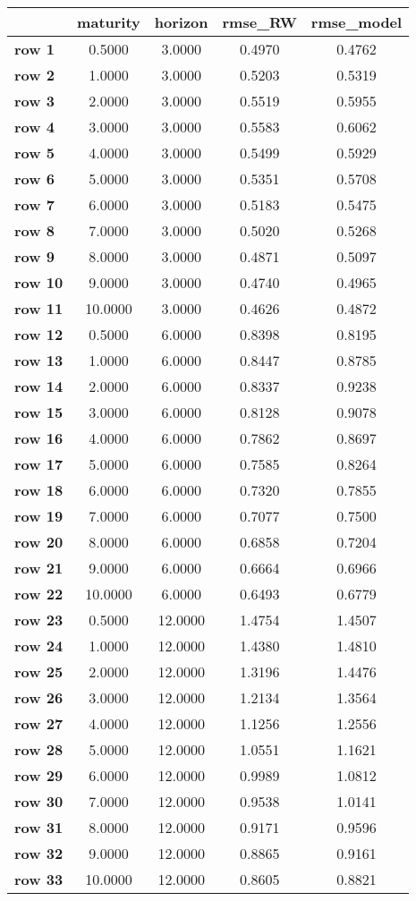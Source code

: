 \begin{tiny}\begin{tabular}{|l|c|c|c|c|}
\hline
&\textbf{maturity}&\textbf{horizon}&\textbf{rmse_RW}&\textbf{rmse_model}\\\hline
\textbf{row 1}&0.5000&3.0000&0.4970&0.4762\\\hline
\textbf{row 2}&1.0000&3.0000&0.5203&0.5319\\\hline
\textbf{row 3}&2.0000&3.0000&0.5519&0.5955\\\hline
\textbf{row 4}&3.0000&3.0000&0.5583&0.6062\\\hline
\textbf{row 5}&4.0000&3.0000&0.5499&0.5929\\\hline
\textbf{row 6}&5.0000&3.0000&0.5351&0.5708\\\hline
\textbf{row 7}&6.0000&3.0000&0.5183&0.5475\\\hline
\textbf{row 8}&7.0000&3.0000&0.5020&0.5268\\\hline
\textbf{row 9}&8.0000&3.0000&0.4871&0.5097\\\hline
\textbf{row 10}&9.0000&3.0000&0.4740&0.4965\\\hline
\textbf{row 11}&10.0000&3.0000&0.4626&0.4872\\\hline
\textbf{row 12}&0.5000&6.0000&0.8398&0.8195\\\hline
\textbf{row 13}&1.0000&6.0000&0.8447&0.8785\\\hline
\textbf{row 14}&2.0000&6.0000&0.8337&0.9238\\\hline
\textbf{row 15}&3.0000&6.0000&0.8128&0.9078\\\hline
\textbf{row 16}&4.0000&6.0000&0.7862&0.8697\\\hline
\textbf{row 17}&5.0000&6.0000&0.7585&0.8264\\\hline
\textbf{row 18}&6.0000&6.0000&0.7320&0.7855\\\hline
\textbf{row 19}&7.0000&6.0000&0.7077&0.7500\\\hline
\textbf{row 20}&8.0000&6.0000&0.6858&0.7204\\\hline
\textbf{row 21}&9.0000&6.0000&0.6664&0.6966\\\hline
\textbf{row 22}&10.0000&6.0000&0.6493&0.6779\\\hline
\textbf{row 23}&0.5000&12.0000&1.4754&1.4507\\\hline
\textbf{row 24}&1.0000&12.0000&1.4380&1.4810\\\hline
\textbf{row 25}&2.0000&12.0000&1.3196&1.4476\\\hline
\textbf{row 26}&3.0000&12.0000&1.2134&1.3564\\\hline
\textbf{row 27}&4.0000&12.0000&1.1256&1.2556\\\hline
\textbf{row 28}&5.0000&12.0000&1.0551&1.1621\\\hline
\textbf{row 29}&6.0000&12.0000&0.9989&1.0812\\\hline
\textbf{row 30}&7.0000&12.0000&0.9538&1.0141\\\hline
\textbf{row 31}&8.0000&12.0000&0.9171&0.9596\\\hline
\textbf{row 32}&9.0000&12.0000&0.8865&0.9161\\\hline
\textbf{row 33}&10.0000&12.0000&0.8605&0.8821\\\hline
\end{tabular}
\end{tiny}